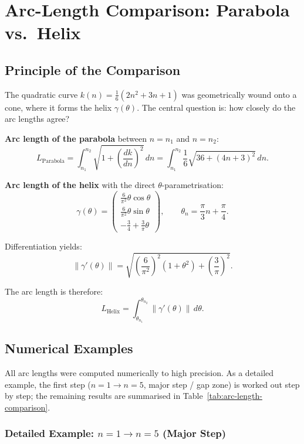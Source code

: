 \chapter{Arc-Length Comparison: Parabola vs.\ Helix}\label{ch:examples}

\section{Principle of the Comparison}

The quadratic curve $k(n) = \frac{1}{6}(2n^2 + 3n + 1)$ was geometrically
wound onto a cone, where it forms the helix $\gamma(\theta)$.
The central question is: how closely do the arc lengths agree?


\textbf{Arc length of the parabola} between $n = n_1$ and $n = n_2$:
\[
L_{\text{Parabola}} = \int_{n_1}^{n_2} \sqrt{1 + \left(\frac{dk}{dn}\right)^2}\, dn
= \int_{n_1}^{n_2} \frac{1}{6}\sqrt{36 + (4n+3)^2}\, dn.
\]

\textbf{Arc length of the helix} with the direct $\theta$-parametrisation:
\[
\gamma(\theta) = \begin{pmatrix}
\frac{6}{\pi^2}\theta\cos\theta\\[4pt]
\frac{6}{\pi^2}\theta\sin\theta\\[4pt]
-\frac{3}{4} + \frac{3}{\pi}\theta
\end{pmatrix},
\qquad
\theta_n = \frac{\pi}{3}n + \frac{\pi}{4}.
\]

Differentiation yields:
\[
\|\gamma'(\theta)\| = \sqrt{\left(\frac{6}{\pi^2}\right)^2(1 + \theta^2)
+ \left(\frac{3}{\pi}\right)^2}.
\]

The arc length is therefore:
\[
L_{\text{Helix}} = \int_{\theta_{n_1}}^{\theta_{n_2}} \|\gamma'(\theta)\|\, d\theta.
\]

\section{Numerical Examples}

All arc lengths were computed numerically to high precision.
As a detailed example, the first step
($n = 1 \to n = 5$, major step / gap zone) is worked out step by step;
the remaining results are summarised in
Table~\ref{tab:arc-length-comparison}.

\subsection{Detailed Example: \texorpdfstring{$n = 1 \rightarrow n = 5$}{n = 1 → n = 5}
 (Major Step)}

